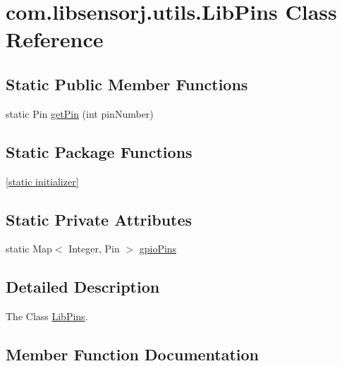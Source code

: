 \hypertarget{classcom_1_1libsensorj_1_1utils_1_1LibPins}{}\section{com.\+libsensorj.\+utils.\+Lib\+Pins Class Reference}
\label{classcom_1_1libsensorj_1_1utils_1_1LibPins}
\subsection*{Static Public Member Functions}
\begin{DoxyCompactItemize}
\item 
static Pin \hyperlink{classcom_1_1libsensorj_1_1utils_1_1LibPins_ad30688404fa1f82b0ef038bc967255c3}{get\+Pin} (int pin\+Number)
\end{DoxyCompactItemize}
\subsection*{Static Package Functions}
\begin{DoxyCompactItemize}
\item 
\hyperlink{classcom_1_1libsensorj_1_1utils_1_1LibPins_a219d56076453e22e5971cfaaf50c70b1}{\mbox{[}static initializer\mbox{]}}
\end{DoxyCompactItemize}
\subsection*{Static Private Attributes}
\begin{DoxyCompactItemize}
\item 
static Map$<$ Integer, Pin $>$ \hyperlink{classcom_1_1libsensorj_1_1utils_1_1LibPins_a46bbd1e6636d9dc4f95d65a38ef33d5d}{gpio\+Pins}
\end{DoxyCompactItemize}


\subsection{Detailed Description}
The Class \hyperlink{classcom_1_1libsensorj_1_1utils_1_1LibPins}{Lib\+Pins}. 

\subsection{Member Function Documentation}
\hypertarget{classcom_1_1libsensorj_1_1utils_1_1LibPins_a219d56076453e22e5971cfaaf50c70b1}{}
